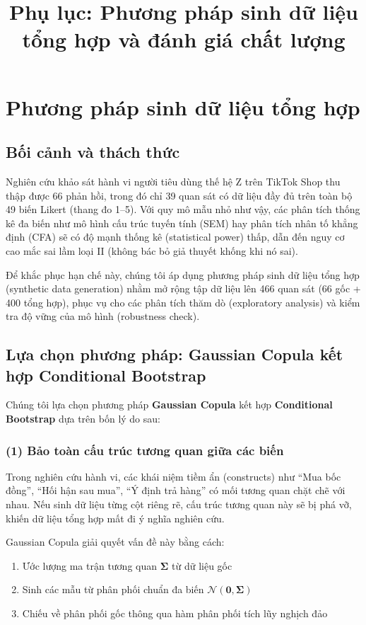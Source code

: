 \documentclass[12pt,a4paper]{article}
\title{Phụ lục: Phương pháp sinh dữ liệu tổng hợp và đánh giá chất lượng}
\author{}
\date{}
\newcommand{\N}{\mathcal{N}}
\begin{document}
\maketitle

\section{Phương pháp sinh dữ liệu tổng hợp}

\subsection{Bối cảnh và thách thức}

Nghiên cứu khảo sát hành vi người tiêu dùng thế hệ Z trên TikTok Shop 
thu thập được 66 phản hồi, trong đó chỉ 39 quan sát có dữ liệu đầy đủ 
trên toàn bộ 49 biến Likert (thang đo 1--5). 
Với quy mô mẫu nhỏ như vậy, các phân tích thống kê đa biến 
như mô hình cấu trúc tuyến tính (SEM) hay phân tích nhân tố khẳng định (CFA) 
sẽ có độ mạnh thống kê (statistical power) thấp, 
dẫn đến nguy cơ cao mắc sai lầm loại II 
(không bác bỏ giả thuyết khống khi nó sai). 

Để khắc phục hạn chế này, chúng tôi áp dụng phương pháp sinh dữ liệu tổng hợp 
(synthetic data generation) nhằm mở rộng tập dữ liệu lên 466 quan sát 
(66 gốc + 400 tổng hợp), phục vụ cho các phân tích thăm dò 
(exploratory analysis) và kiểm tra độ vững của mô hình (robustness check).

\subsection{Lựa chọn phương pháp: Gaussian Copula kết hợp Conditional Bootstrap}

Chúng tôi lựa chọn phương pháp \textbf{Gaussian Copula} kết hợp 
\textbf{Conditional Bootstrap} dựa trên bốn lý do sau:

\subsubsection{(1) Bảo toàn cấu trúc tương quan giữa các biến}

Trong nghiên cứu hành vi, các khái niệm tiềm ẩn (constructs) như 
``Mua bốc đồng'', ``Hối hận sau mua'', ``Ý định trả hàng'' 
có mối tương quan chặt chẽ với nhau. 
Nếu sinh dữ liệu từng cột riêng rẽ, cấu trúc tương quan này sẽ bị phá vỡ, 
khiến dữ liệu tổng hợp mất đi ý nghĩa nghiên cứu.

Gaussian Copula giải quyết vấn đề này bằng cách:
\begin{enumerate}
    \item Ước lượng ma trận tương quan $\bm{\Sigma}$ từ dữ liệu gốc
    \item Sinh các mẫu từ phân phối chuẩn đa biến $\N(\bm{0}, \bm{\Sigma})$
    \item Chiếu về phân phối gốc thông qua hàm phân phối tích lũy nghịch đảo
\end{enumerate}
\end{document}
